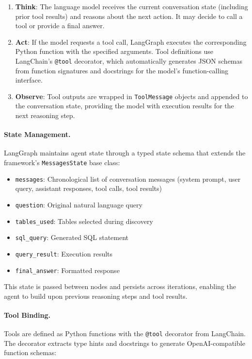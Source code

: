 \begin{enumerate}
    \item \textbf{Think}: The language model receives the current conversation state (including prior tool results) and reasons about the next action. It may decide to call a tool or provide a final answer.

    \item \textbf{Act}: If the model requests a tool call, LangGraph executes the corresponding Python function with the specified arguments. Tool definitions use LangChain's \texttt{@tool} decorator, which automatically generates JSON schemas from function signatures and docstrings for the model's function-calling interface.

    \item \textbf{Observe}: Tool outputs are wrapped in \texttt{ToolMessage} objects and appended to the conversation state, providing the model with execution results for the next reasoning step.
\end{enumerate}

\paragraph{State Management.}
LangGraph maintains agent state through a typed state schema that extends the framework's \texttt{MessagesState} base class:

\begin{itemize}
    \item \texttt{messages}: Chronological list of conversation messages (system prompt, user query, assistant responses, tool calls, tool results)
    \item \texttt{question}: Original natural language query
    \item \texttt{tables\_used}: Tables selected during discovery
    \item \texttt{sql\_query}: Generated SQL statement
    \item \texttt{query\_result}: Execution results
    \item \texttt{final\_answer}: Formatted response
\end{itemize}

This state is passed between nodes and persists across iterations, enabling the agent to build upon previous reasoning steps and tool results.

\paragraph{Tool Binding.}
Tools are defined as Python functions with the \texttt{@tool} decorator from LangChain. The decorator extracts type hints and docstrings to generate OpenAI-compatible function schemas:

